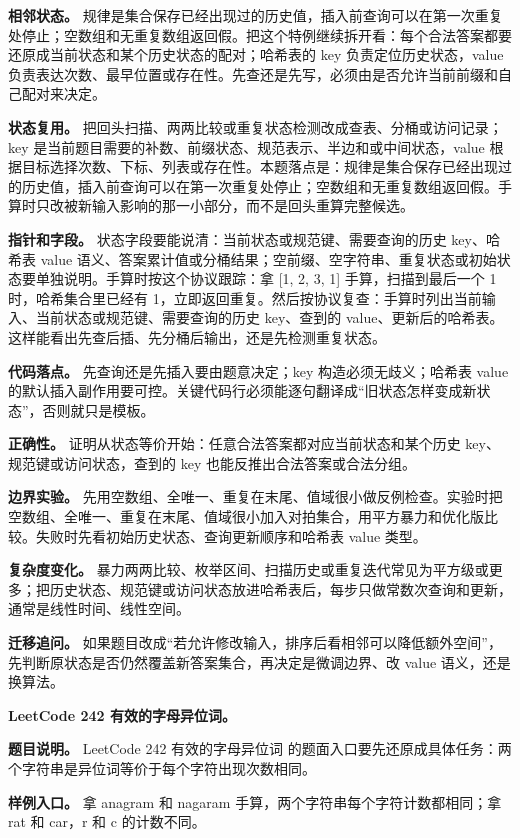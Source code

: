 \textbf{相邻状态。} 规律是集合保存已经出现过的历史值，插入前查询可以在第一次重复处停止；空数组和无重复数组返回假。把这个特例继续拆开看：每个合法答案都要还原成当前状态和某个历史状态的配对；哈希表的 key 负责定位历史状态，value 负责表达次数、最早位置或存在性。先查还是先写，必须由是否允许当前前缀和自己配对来决定。

\textbf{状态复用。} 把回头扫描、两两比较或重复状态检测改成查表、分桶或访问记录；key 是当前题目需要的补数、前缀状态、规范表示、半边和或中间状态，value 根据目标选择次数、下标、列表或存在性。本题落点是：规律是集合保存已经出现过的历史值，插入前查询可以在第一次重复处停止；空数组和无重复数组返回假。手算时只改被新输入影响的那一小部分，而不是回头重算完整候选。

\textbf{指针和字段。} 状态字段要能说清：当前状态或规范键、需要查询的历史 key、哈希表 value 语义、答案累计值或分桶结果；空前缀、空字符串、重复状态或初始状态要单独说明。手算时按这个协议跟踪：拿 [1, 2, 3, 1] 手算，扫描到最后一个 1 时，哈希集合里已经有 1，立即返回重复。然后按协议复查：手算时列出当前输入、当前状态或规范键、需要查询的历史 key、查到的 value、更新后的哈希表。这样能看出先查后插、先分桶后输出，还是先检测重复状态。

\textbf{代码落点。} 先查询还是先插入要由题意决定；key 构造必须无歧义；哈希表 value 的默认插入副作用要可控。关键代码行必须能逐句翻译成“旧状态怎样变成新状态”，否则就只是模板。

\textbf{正确性。} 证明从状态等价开始：任意合法答案都对应当前状态和某个历史 key、规范键或访问状态，查到的 key 也能反推出合法答案或合法分组。

\textbf{边界实验。} 先用空数组、全唯一、重复在末尾、值域很小做反例检查。实验时把空数组、全唯一、重复在末尾、值域很小加入对拍集合，用平方暴力和优化版比较。失败时先看初始历史状态、查询更新顺序和哈希表 value 类型。

\textbf{复杂度变化。} 暴力两两比较、枚举区间、扫描历史或重复迭代常见为平方级或更多；把历史状态、规范键或访问状态放进哈希表后，每步只做常数次查询和更新，通常是线性时间、线性空间。

\textbf{迁移追问。} 如果题目改成“若允许修改输入，排序后看相邻可以降低额外空间”，先判断原状态是否仍然覆盖新答案集合，再决定是微调边界、改 value 语义，还是换算法。

\noindent\textbf{LeetCode 242 有效的字母异位词。}

\textbf{题目说明。} LeetCode 242 有效的字母异位词 的题面入口要先还原成具体任务：两个字符串是异位词等价于每个字符出现次数相同。

\textbf{样例入口。} 拿 anagram 和 nagaram 手算，两个字符串每个字符计数都相同；拿 rat 和 car，r 和 c 的计数不同。

